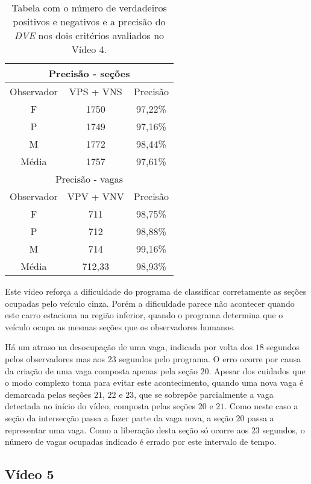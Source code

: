 \begin{table}[H]
\begin{center}
\begin{tabular}{|c||c||c|}
\hline
\multicolumn{3}{|c|}{Precisão - seções}  \\ \hline \hline
Observador & VPS + VNS & Precisão \\ \hline
F & 1750 & 97,22\% \\  \hline
P & 1749 & 97,16\% \\ \hline
M & 1772 & 98,44\% \\ \hline
Média & 1757 & 97,61\% \\
\hline
\hline
\multicolumn{3}{|c|}{Precisão - vagas}  \\ \hline \hline
Observador & VPV + VNV & Precisão \\ \hline
F & 711 & 98,75\% \\  \hline
P & 712 & 98,88\% \\ \hline
M & 714 & 99,16\% \\ \hline
Média & 712,33 & 98,93\% \\
\hline
\end{tabular}
\end{center}
\caption{Tabela com o número de verdadeiros positivos e negativos e a precisão do \textit{DVE} nos dois critérios avaliados no Vídeo 4.}
\label{tab:rvideo4}
\end{table}

Este vídeo reforça a dificuldade do programa de classificar corretamente as seções ocupadas pelo veículo cinza. Porém a dificuldade parece não acontecer quando este carro estaciona na região inferior, quando o programa determina que o veículo ocupa as mesmas seções que os observadores humanos.

Há um atraso na desocupação de uma vaga, indicada por volta dos $18$ segundos pelos observadores mas aos $23$ segundos pelo programa. O erro ocorre por causa da criação de uma vaga composta apenas pela seção $20$. Apesar dos cuidados que o modo complexo toma para evitar este acontecimento, quando uma nova vaga é demarcada pelas seções $21$, $22$ e $23$, que se sobrepõe parcialmente a vaga detectada no início do vídeo, composta pelas seções $20$ e $21$. Como neste caso a seção da intersecção passa a fazer parte da vaga nova, a seção $20$ passa a representar uma vaga. Como a liberação desta seção só ocorre aos $23$ segundos, o número de vagas ocupadas indicado é errado por este intervalo de tempo.


\subsection{Vídeo 5}

